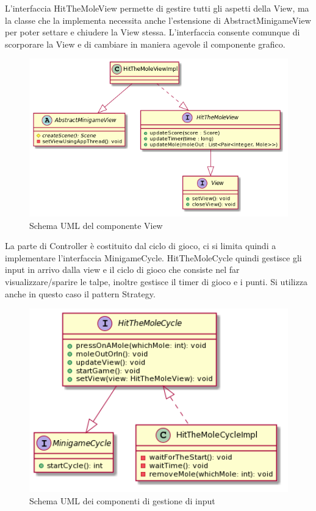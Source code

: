 \documentclass[a4paper,12pt]{report}
\begin{document}
	L'interfaccia HitTheMoleView permette di gestire tutti gli aspetti della View, ma la classe che la implementa necessita anche l'estensione di AbstractMinigameView per poter settare e chiudere la View stessa.
    L'interfaccia consente comunque di scorporare la View e di cambiare in maniera agevole il componente grafico.\newline
    \begin{figure}[!t]
        \centering{}
        \includegraphics[width=150mm]{images/squarcialupi/molegame-viewPart.png}
        \caption{Schema UML del componente View}
        \label{img:molegame-viewPart}
    \end{figure}

	La parte di Controller è costituito dal ciclo di gioco, ci si limita quindi a implementare l'interfaccia MinigameCycle.
	HitTheMoleCycle quindi gestisce gli input in arrivo dalla view e il ciclo di gioco che consiste nel far visualizzare/sparire le talpe, inoltre gestisce il timer di gioco e i punti.
    Si utilizza anche in questo caso il pattern Strategy.
    \begin{figure}[!t]
        \centering{}
        \includegraphics[width=150mm]{images/squarcialupi/molegame-controllerPart.png}
        \caption{Schema UML dei componenti di gestione di input}
        \label{img:molegame-controllerPart}
    \end{figure}
\end{document}
